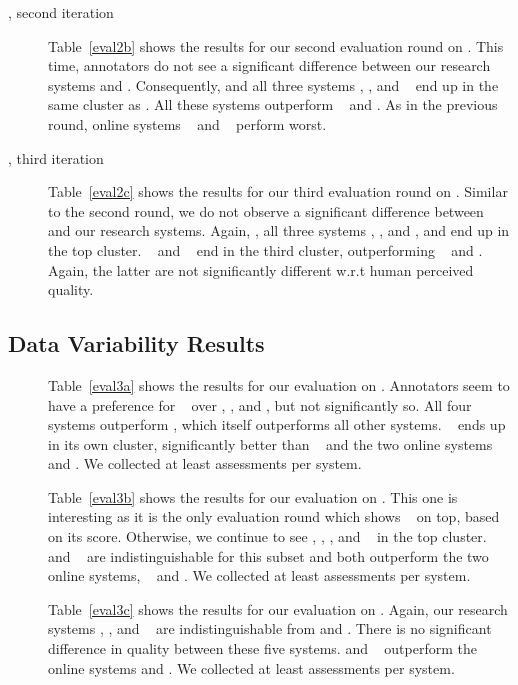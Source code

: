 \documentclass[a4paper]{article}
\begin{document}
\begin{CJK*}{UTF8}{gbsn}
\begin{description}
\item[\SubsetB, second iteration] Table~\ref{eval2b} shows the results for our second evaluation round on \SubsetB. This time, annotators do not see a significant difference between our research systems and \RefPE. Consequently, \RefHT and all three systems \ComboA, \ComboB, and \ComboC~ end up in the same cluster as \RefPE. All these systems outperform \Sogou~ and \RefWMT. As in the previous round, online systems \Microsoft~ and \Google~ perform worst.

\item[\SubsetB, third iteration] Table~\ref{eval2c} shows the results for our third evaluation round on \SubsetB. Similar to the second round, we do not observe a significant difference between \RefPE~ and our research systems. Again, \RefHT, all three systems \ComboA, \ComboB, and \ComboC, and \RefPE{} end up in the top cluster. \Sogou~ and \RefWMT~ end in the third cluster, outperforming \Microsoft~ and \Google. Again, the latter are not significantly different w.r.t human perceived quality.
\end{description}

\subsection{Data Variability Results}
\begin{description}
\item[\SubsetC] Table~\ref{eval3a} shows the results for our evaluation on \SubsetC. Annotators seem to have a preference for \RefHT~ over \ComboA, \ComboB, and \ComboC, but not significantly so. All four systems outperform \RefPE, which itself outperforms all other systems. \Sogou~ ends up in its own cluster, significantly better than \RefWMT~ and the two online systems \Microsoft~ and \Google. We collected at least  assessments per system.

\item[\SubsetD] Table~\ref{eval3b} shows the results for our evaluation on \SubsetD. This one is interesting as it is the only evaluation round which shows \RefPE~ on top, based on its  score. Otherwise, we continue to see \RefHT, \ComboA, \ComboB, and \ComboC~ in the top cluster. \Sogou~ and \RefWMT~ are indistinguishable for this subset and both outperform the two online systems, \Microsoft~ and \Google. We collected at least  assessments per system. 

\item[\SubsetE] Table~\ref{eval3c} shows the results for our evaluation on \SubsetE. Again, our research systems \ComboA, \ComboB, and \ComboC~ are indistinguishable from \RefHT{} and \RefPE. There is no significant difference in quality between these five systems. \Sogou{} and \RefWMT~ outperform the online systems \Microsoft{} and \Google. We collected at least  assessments per system. 
\end{description}




\end{CJK*}
\end{document}

